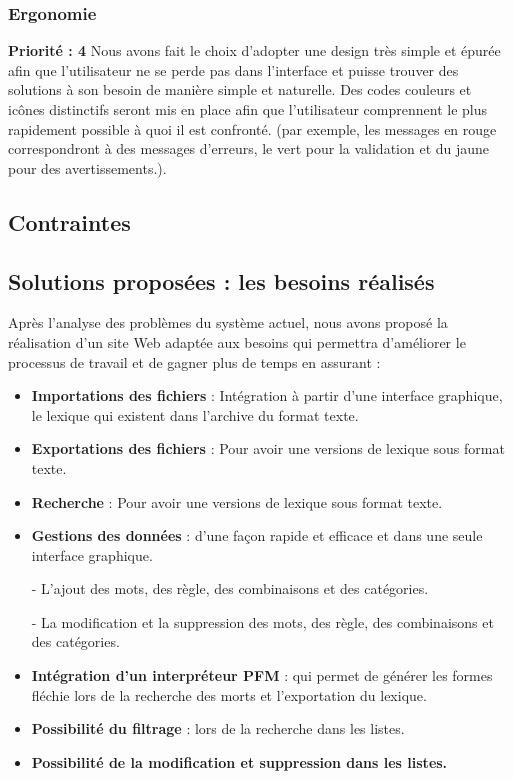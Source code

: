 \documentclass[12pt,a4paper]{article}
\begin{document}
\subsubsection{Ergonomie}
\textbf{Priorité : 4}
\smallbreak
Nous avons fait le choix d'adopter une design très simple et épurée afin que l'utilisateur ne se perde pas dans l'interface et puisse trouver des solutions à son besoin de manière simple et naturelle.
\smallbreak
Des codes couleurs et icônes distinctifs seront mis en place afin que l'utilisateur comprennent le plus rapidement possible à quoi il est confronté. (par exemple, les messages en rouge correspondront à des messages d'erreurs, le vert pour la validation et du jaune pour des avertissements.).

\subsection{Contraintes}
\subsection{Solutions proposées : les besoins réalisés}

Après l'analyse des problèmes du système actuel, nous avons proposé la réalisation d'un site Web  adaptée aux besoins 
qui permettra d'améliorer le processus de travail et de gagner plus de temps en assurant :

\begin{itemize}
\item \textbf{Importations des fichiers} : Intégration à partir d'une interface graphique, le lexique qui existent dans l'archive du format texte.
\item \textbf{Exportations des fichiers} : Pour avoir une versions de lexique sous format texte.
\item \textbf{Recherche} : Pour avoir une versions de lexique sous format texte.
\item \textbf{Gestions des données} : d'une façon rapide et efficace et dans une seule interface graphique.


- L'ajout des mots, des règle, des combinaisons et des catégories.


- La modification et la suppression des mots, des règle, des combinaisons et des catégories.
\item \textbf{Intégration d'un interpréteur PFM } : qui permet de générer les formes fléchie lors de la recherche des morts et l'exportation du lexique.
\item \textbf{Possibilité du filtrage} : lors de la recherche dans les listes.
\item \textbf{Possibilité de la modification et suppression dans les listes.}
\end{itemize}
\end{document}
